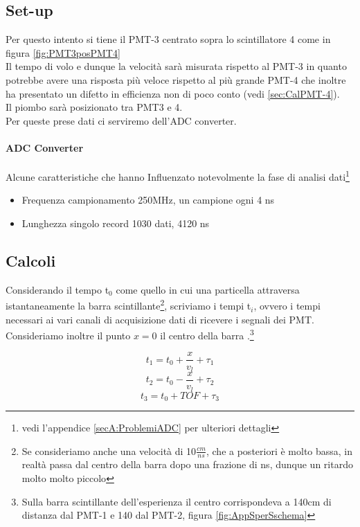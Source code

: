 \documentclass[a4paper]{article}
\begin{document}
\subsection*{Set-up}
Per questo intento si tiene il PMT-3 centrato sopra lo scintillatore 4 come in figura \ref{fig:PMT3posPMT4}\\
Il tempo di volo e dunque la velocità sarà misurata rispetto al PMT-3 in quanto potrebbe avere una risposta più veloce rispetto al più grande PMT-4 che inoltre ha presentato un difetto in efficienza non di poco conto (vedi \ref{sec:CalPMT-4}).\\
Il piombo sarà posizionato tra PMT3 e 4.\\
Per queste prese dati ci serviremo dell'ADC converter.

\paragraph{ADC Converter}
Alcune caratteristiche che hanno Influenzato notevolmente la fase di analisi dati\footnote{vedi l'appendice \ref{secA:ProblemiADC} per ulteriori dettagli}

\begin{itemize}
\item Frequenza campionamento 250MHz, un campione ogni 4 ns
\item Lunghezza singolo record 1030 dati, 4120 ns
\end{itemize}

\subsection{Calcoli}
\label{sec:CalcoliVMu}
Considerando il tempo t$_0$ come quello in cui una particella attraversa istantaneamente la barra scintillante\footnote{Se consideriamo anche una velocità di 10$\frac{cm}{ns}$, che a posteriori è molto bassa, in realtà passa dal centro della barra dopo una frazione di ns, dunque un ritardo molto molto piccolo}, scriviamo i tempi t$_i$, ovvero i tempi necessari ai vari canali di acquisizione dati di ricevere i segnali dei PMT.\\
Consideriamo inoltre il punto $x = 0$ il centro della barra .\footnote{Sulla barra scintillante dell'esperienza il centro corrispondeva a 140cm di distanza dal PMT-1 e 140 dal PMT-2, figura \ref{fig:AppSperSschema}}

\begin{equation}
t_1 = t_0 + \frac{x}{v_l} + \tau_1
\end{equation}
\begin{equation}
t_2 = t_0 - \frac{x}{v_l} + \tau_2
\end{equation}
\begin{equation}
t_3 = t_0 + TOF + \tau_3
\label{eq:TempiPMT}
\end{equation}
\end{document}
